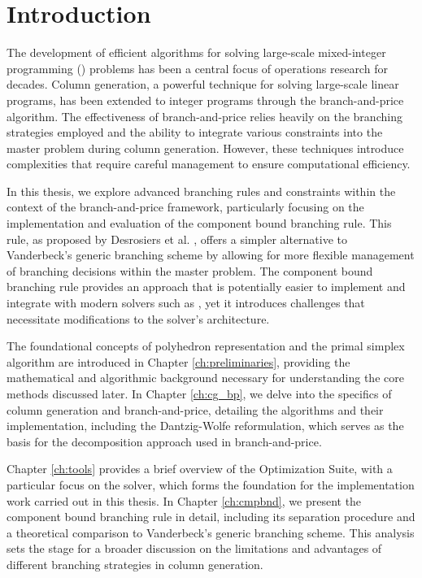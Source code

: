 \chapter{Introduction}
The development of efficient algorithms for solving large-scale mixed-integer programming (\MIP{}) problems has been a central focus of operations research for decades. Column generation, a powerful technique for solving large-scale linear programs, has been extended to integer programs through the branch-and-price algorithm. The effectiveness of branch-and-price relies heavily on the branching strategies employed and the ability to integrate various constraints into the master problem during column generation. However, these techniques introduce complexities that require careful management to ensure computational efficiency.

In this thesis, we explore advanced branching rules and constraints within the context of the branch-and-price framework, particularly focusing on the implementation and evaluation of the component bound branching rule. This rule, as proposed by Desrosiers et al. \cite{thebook}, offers a simpler alternative to Vanderbeck's generic branching scheme \cite{vanderbeck2011branching} by allowing for more flexible management of branching decisions within the master problem. The component bound branching rule provides an approach that is potentially easier to implement and integrate with modern solvers such as \GCG{}, yet it introduces challenges that necessitate modifications to the solver's architecture.

The foundational concepts of polyhedron representation and the primal simplex algorithm are introduced in Chapter \ref{ch:preliminaries}, providing the mathematical and algorithmic background necessary for understanding the core methods discussed later. In Chapter \ref{ch:cg_bp}, we delve into the specifics of column generation and branch-and-price, detailing the algorithms and their implementation, including the Dantzig-Wolfe reformulation, which serves as the basis for the decomposition approach used in branch-and-price.

Chapter \ref{ch:tools} provides a brief overview of the \SCIP{} Optimization Suite, with a particular focus on the \GCG{} solver, which forms the foundation for the implementation work carried out in this thesis. In Chapter \ref{ch:cmpbnd}, we present the component bound branching rule in detail, including its separation procedure and a theoretical comparison to Vanderbeck's generic branching scheme. This analysis sets the stage for a broader discussion on the limitations and advantages of different branching strategies in column generation.

